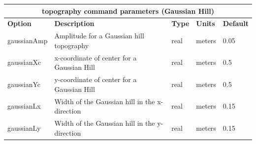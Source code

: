 \documentclass[11pt]{report}
\begin{document}
\begin{center}
\begin{tabular}{|l|p{8cm}|l|l|l|} \hline
\multicolumn{5}{|c|}{\bf topography command parameters (Gaussian Hill)}\\ \hline
\bf{Option} & \bf{Description} & \bf{Type} & \bf{Units} & \bf{Default}\\ \hline \hline
%
gaussianAmp & Amplitude for a Gaussian hill topography & real & meters & 0.05\\ \hline	
gaussianXc & x-coordinate of center for a Gaussian Hill & real & meters & 0.5\\ \hline	
gaussianYc & y-coordinate of center for a Gaussian Hill & real & meters & 0.5 \\ \hline
gaussianLx & Width of the Gaussian hill in the x-direction & real & meters & 0.15 \\ \hline
gaussianLy & Width of the Gaussian hill in the y-direction & real & meters & 0.15 \\ \hline
\end{tabular}
\end{center}

\end{document}
